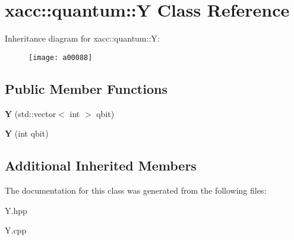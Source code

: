 \hypertarget{a00088}{}\section{xacc\+:\+:quantum\+:\+:Y Class Reference}
\label{a00088}
Inheritance diagram for xacc\+:\+:quantum\+:\+:Y\+:\begin{figure}[H]
\begin{center}
\leavevmode
\texttt{[image: a00088]}
\end{center}
\end{figure}
\subsection*{Public Member Functions}
\begin{DoxyCompactItemize}
\item 
{\bfseries Y} (std\+::vector$<$ int $>$ qbit)\hypertarget{a00088_a7959be0aa8221c0b1ba445771f5ecf0a}{}\label{a00088_a7959be0aa8221c0b1ba445771f5ecf0a}

\item 
{\bfseries Y} (int qbit)\hypertarget{a00088_aea2b37ac45208cbf6a47e0074e4a9653}{}\label{a00088_aea2b37ac45208cbf6a47e0074e4a9653}

\end{DoxyCompactItemize}
\subsection*{Additional Inherited Members}


The documentation for this class was generated from the following files\+:\begin{DoxyCompactItemize}
\item 
Y.\+hpp\item 
Y.\+cpp\end{DoxyCompactItemize}
